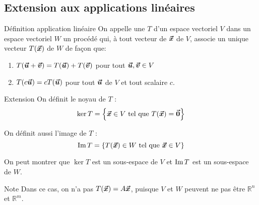 \documentclass[a4paper]{article}
\begin{document}
\subsection{Extension aux applications linéaires}
\begin{parag}{Définition application linéaire }
    On appelle une  $T$ d'un espace vectoriel $V$ dans un espace vectoriel $W$ un procédé qui, à tout vecteur de $\bm{\protect\vec{x}}$ de $V$, associe un unique vecteur $T\left(\bvec{x}\right)$ de $W$ de façon que:
    \begin{enumerate}
        \item $T\left(\bvec{u} + \bvec{v}\right) = T\left(\bvec{u}\right) + T\left(\bvec{v}\right)$ pour tout $\bm{\protect\vec{u}}, \bm{\protect\vec{v}} \in V$
        \item $T\left(c \bvec{u}\right) = cT\left(\bvec{u}\right)$ pour tout $\bm{\protect\vec{u}}$ de $V$ et tout scalaire $c$.
    \end{enumerate}

\end{parag}


\begin{parag}{Extension}
    On définit le noyau de $T$ :
    \[\ker T = \left\{\bvec{x} \in V \telque T\left(\bvec{x}\right) = \bvec{0}\right\}\]

    On définit aussi l'image de $T$ :
    \[\im T = \left\{T\left(\bvec{x}\right) \in W \telque \bvec{x} \in V\right\}\]

    On peut montrer que $\ker T$ est un sous-espace de $V$ et $\operatorname{Im} T$ est un sous-espace de $W$.

    \begin{subparag}{Note}
        Dans ce cas, on n'a pas $T\left(\bvec{x}\right) = A \bvec{x}$, puisque $V$ et $W$ peuvent ne pas être $\mathbb{R}^{n}$ et $\mathbb{R}^{m}$.
    \end{subparag}

\end{parag}
\end{document}
